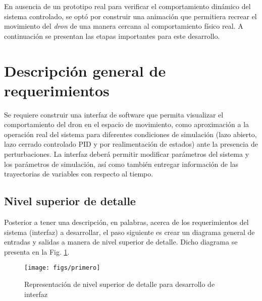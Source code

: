 \newpage
{}\label{anexoC}
En ausencia de un prototipo real para verificar el comportamiento dinámico del sistema controlado, se optó por construir una animación que permitiera recrear el movimiento del \emph{dron} de una manera cercana al comportamiento físico real. A continuación se presentan las etapas importantes para este desarrollo.

\section*{Descripción general de requerimientos}
Se requiere construir una interfaz de software que permita visualizar el comportamiento del dron en el espacio de movimiento, como aproximación a la operación real del sistema para diferentes condiciones de simulación (lazo abierto, lazo cerrado controlado PID y por realimentación de estados) ante la presencia de perturbaciones. La interfaz deberá permitir modificar parámetros del sistema y los parámetros de simulación, así como también entregar información de las trayectorias de variables con respecto al tiempo.

\subsection*{Nivel superior de detalle}
Posterior a tener una descripción, en palabras, acerca de los requerimientos del sistema (interfaz) a desarrollar, el paso siguiente es crear un diagrama general de entradas y salidas a manera de nivel superior de detalle. Dicho diagrama se presenta en la Fig. \ref{1211}.
\begin{figure}[h]
\centering
\caption[]{Representación de nivel superior de detalle para desarrollo de interfaz}\label{1211}
\texttt{[image: figs/primero]}
\end{figure}

